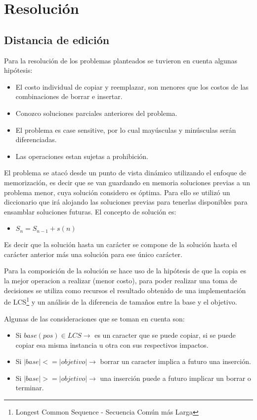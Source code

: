 \documentclass[12pt]{article}
\begin{document}
\newpage
\section{Resolución}
\subsection{Distancia de edición}
Para la resolución de los problemas planteados se tuvieron en cuenta
algunas hipótesis:

\begin{itemize}
	\item El costo individual de copiar y reemplazar, son menores que los costos de las
combinaciones de borrar e insertar.
	\item Conozco soluciones parciales anteriores del problema.
	\item El problema es case sensitive, por lo cual mayúsculas y minúsculas serán
diferenciadas.
	\item Las operaciones estan sujetas a prohibición.
\end{itemize}

El problema se atacó desde un punto de vista dinámico utilizando el enfoque de
memorización, es decir que se van guardando en memoria soluciones previas a un problema
menor, cuya solución considero es óptima.
Para ello se utilizó un diccionario que irá alojando las soluciones previas para tenerlas
disponibles para ensamblar soluciones futuras. El concepto de solución es:
\begin{itemize}
	\item $S_{n}=S_{n-1}+s(n)$
\end{itemize}

Es decir que la solución hasta un carácter se compone de la solución hasta el carácter anterior
más una solución para ese único carácter.

Para la composición de la solución se hace uso de la hipótesis de que la
copia es la mejor operacion a realizar (menor costo), para poder realizar
una toma de decisiones se utiliza como recursos el resultado obtenido de
una implementación de LCS\footnote{Longest Common Sequence - Secuencia Común más Larga}
y un análisis de la diferencia de tamaños entre la base y el objetivo.

Algunas de las consideraciones que se toman en cuenta son:
\begin{itemize}
	\item Si $base(pos)\in LCS \rightarrow$ es un caracter que se puede 
	copiar, si se puede copiar esa misma instancia u otra con sus respectivos
	impactos.
	\item Si $|base| <= |objetivo| \rightarrow$ borrar un caracter implica 
	a futuro una inserción.
	\item Si $|base| >= |objetivo| \rightarrow$ una inserción puede a futuro
	implicar un borrar o terminar.
\end{itemize}
\end{document}
